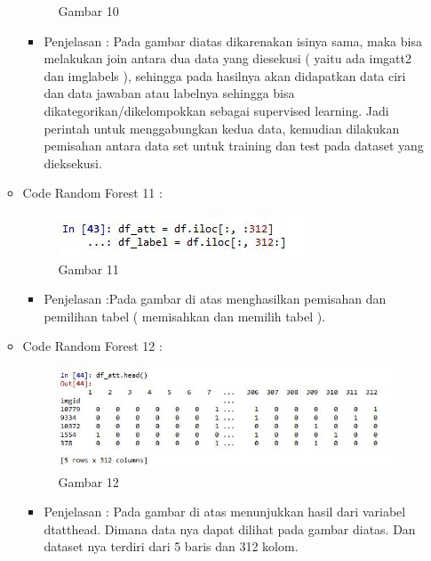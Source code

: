\begin{enumerate}
\begin{itemize}
\begin{figure}[ht]
\caption{Gambar 10}
\label{contoh}
\end{figure}
\par
\begin{itemize}
\item Penjelasan : Pada gambar diatas dikarenakan isinya sama, maka bisa melakukan join antara dua data yang diesekusi ( yaitu ada imgatt2 dan imglabels ), sehingga pada hasilnya akan didapatkan data ciri dan data jawaban atau labelnya sehingga bisa dikategorikan/dikelompokkan sebagai supervised learning. Jadi perintah untuk menggabungkan kedua data, kemudian dilakukan pemisahan antara data set untuk training dan test pada dataset yang dieksekusi.
\par
\par
\end{itemize}
\item Code Random Forest 11 :
\par
\begin{figure}[ht]
\centering
\includegraphics[scale=0.7]{figures/AFS/4k.jpg}
\caption{Gambar 11}
\label{contoh}
\end{figure}
\par
\begin{itemize}
\item Penjelasan :Pada gambar di atas menghasilkan pemisahan dan pemilihan tabel ( memisahkan dan memilih tabel ). 
\par
\par
\end{itemize}
\item Code Random Forest 12 :
\par
\begin{figure}[ht]
\centering
\includegraphics[scale=0.7]{figures/AFS/4l.jpg}
\caption{Gambar 12}
\label{contoh}
\end{figure}
\par
\begin{itemize}
\item Penjelasan : Pada gambar di atas menunjukkan hasil dari variabel dtatthead. Dimana data nya dapat dilihat pada gambar diatas. Dan dataset nya terdiri dari 5 baris dan 312 kolom.

\end{itemize}
\end{itemize}
\end{enumerate}
